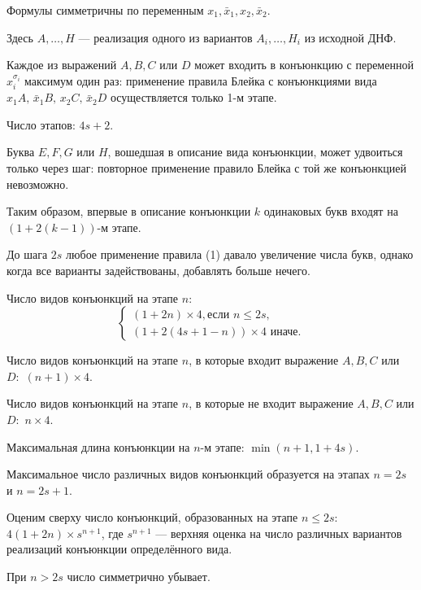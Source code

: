 \documentclass[12pt,a4paper,oneside,fleqn,leqno]{article}
\theoremstyle{definition}
\begin{document}
			Формулы симметричны по переменным $x_1, \bar{x}_1, x_2, \bar{x}_2.$\par
			Здесь $A, \ldots, H$ --- реализация одного из вариантов $A_i, \ldots, H_i$ из исходной ДНФ.\par
			Каждое из выражений $A, B, C$ или $D$ может входить в конъюнкцию с переменной $x_i^{\sigma_i}$ максимум один раз: применение правила Блейка с конъюнкциями вида $x_1A,\,\bar{x}_1B, \,x_2C, \,\bar{x}_2D$ осуществляется только 1-м этапе. \par
			Число этапов: $4s + 2.$\par
			Буква $E, F, G$ или $H$, вошедшая в описание вида конъюнкции, может удвоиться только через шаг: повторное применение правило Блейка с той же конъюнкцией невозможно.\par
			Таким образом, впервые в описание конъюнкции $k$ одинаковых букв входят на $(1 + 2(k - 1))$-м этапе.\par
			До шага $2s$ любое применение правила (1) давало увеличение числа букв, однако когда все варианты задействованы, добавлять больше нечего.\par
			Число видов конъюнкций на этапе $n:$ 
			$$
				\begin{cases}
					(1 + 2n)\times4, \text{если $n \leqslant 2s,$}\\
					(1 + 2(4s + 1 - n))\times4 \text{ иначе.}
				\end{cases}
			$$\par
			Число видов конъюнкций на этапе $n$, в которые входит выражение $A, B, C$ или $D:$ $(n + 1)\times4.$\par
			Число видов конъюнкций на этапе $n$, в которые не входит выражение $A, B, C$ или $D:$ $n\times4.$\par
			Максимальная длина конъюнкции на $n$-м этапе: $\min(n + 1, 1 + 4s)$.\par
			Максимальное число различных видов конъюнкций образуется на этапах $n = 2s$ и $n = 2s + 1$.\par
			Оценим сверху число конъюнкций, образованных на этапе $n \leqslant 2s:$ $4(1 + 2n) \times s^{n + 1}$, где $s^{n + 1}$ --- верхняя оценка на число различных вариантов реализаций конъюнкции определённого вида.\par
			При $n > 2s$ число симметрично убывает.\par
\end{document}
